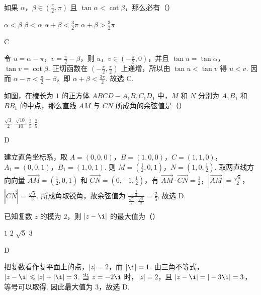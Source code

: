 \documentclass[UTF8,a4paper,oneside,11pt]{ctexbook}
\begin{document}
\begin{problem}
如果 \(\alpha\)，\(\beta \in \left(\frac{\pi}{2}, \pi\right)\) 且 \(\tan \alpha < \cot \beta\)，那么必有（\quad）

\choices
    {\(\alpha < \beta\)}
    {\(\beta < \alpha\)}
    {\(\alpha + \beta < \frac{3}{2}\pi\)}
    {\(\alpha + \beta > \frac{3}{2}\pi\)}

\begin{answer}
C
\end{answer}

\begin{solution}
令 \(u=\alpha-\pi\)，\(v=\frac{\pi}{2}-\beta\)，则 \(u\)，\(v\in\left(-\frac{\pi}{2},0\right)\)，并且 \(\tan u=\tan\alpha\)，\(\tan v=\cot\beta\). 正切函数在 \(\left(-\frac{\pi}{2},\frac{\pi}{2}\right)\) 上递增，所以由 \(\tan u<\tan v\) 得 \(u<v\). 因而 \(\alpha-\pi<\frac{\pi}{2}-\beta\)，即 \(\alpha+\beta<\frac{3\pi}{2}\). 故选 C.
\end{solution}
\end{problem}

\begin{problem}
如图，在棱长为 \(1\) 的正方体 \(ABCD-A_{1}B_{1}C_{1}D_{1}\) 中，\(M\) 和 \(N\) 分别为 \(A_{1}B_{1}\) 和 \(BB_{1}\) 的中点，那么直线 \(AM\) 与 \(CN\) 所成角的余弦值是（\quad）


\choices
    {\(\frac{\sqrt{3}}{2}\)}
    {\(\frac{\sqrt{10}}{10}\)}
    {\(\frac{3}{5}\)}
    {\(\frac{2}{5}\)}

\begin{answer}
D
\end{answer}

\begin{solution}
建立直角坐标系，取 \(A=(0,0,0)\)，\(B=(1,0,0)\)，\(C=(1,1,0)\)，\(A_1=(0,0,1)\)，\(B_1=(1,0,1)\). 则 \(M=\left(\frac{1}{2},0,1\right)\)，\(N=\left(1,0,\frac{1}{2}\right)\). 取两直线方向向量 \(\overrightarrow{AM}=\left(\frac{1}{2},0,1\right)\) 和 \(\overrightarrow{CN}=\left(0,-1,\frac{1}{2}\right)\)，有
\(\overrightarrow{AM}\cdot\overrightarrow{CN}=\frac{1}{2}\)，\(\left|\overrightarrow{AM}\right|=\frac{\sqrt{5}}{2}\)，\(\left|\overrightarrow{CN}\right|=\frac{\sqrt{5}}{2}\). 所成角取锐角，故余弦值为 \(\frac{\frac{1}{2}}{\frac{\sqrt{5}}{2}\cdot\frac{\sqrt{5}}{2}}=\frac{2}{5}\). 故选 D.
\end{solution}
\end{problem}

\begin{problem}
已知复数 \(z\) 的模为 \(2\)，则 \(|z - \i|\) 的最大值为（\quad）

\choices
    {\(1\)}
    {\(2\)}
    {\(\sqrt{5}\)}
    {\(3\)}

\begin{answer}
D
\end{answer}

\begin{solution}
把复数看作复平面上的点，\(|z|=2\)，而 \(|\i|=1\). 由三角不等式，\(|z-\i|\leqslant |z|+|\i|=3\). 当 \(z=-2\i\) 时，\(|z|=2\)，且 \(|z-\i|=|-3\i|=3\)，等号可以取得. 因此最大值为 \(3\)，故选 D.
\end{solution}
\end{problem}
\end{document}

